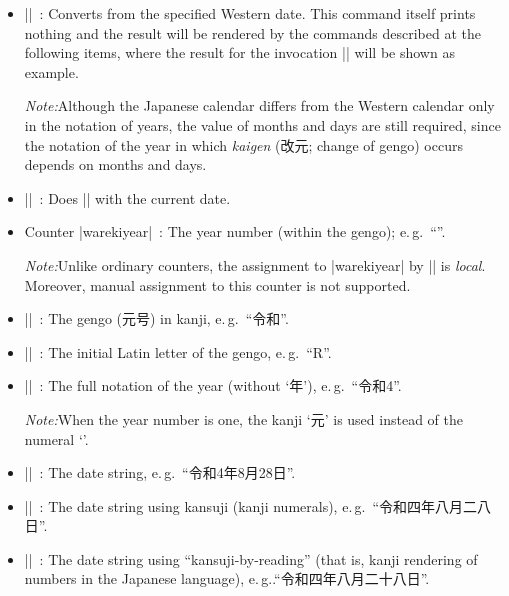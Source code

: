 \documentclass[a4paper]{article}
\newcommand{\Meta}[1]{$\langle$\textit{#1}$\rangle$}
\newcommand{\Note}{\par\noindent\emph{Note:}\quad}
\newcommand{\Eg}{e.\,g.}
\newcommand{\Means}{~:\quad}
\newcommand*{\Ja}[1]{{\fIpaex#1}}
\newcommand*{\+}{\hspace{0.25em minus 0.25em}}
\begin{document}
\begin{itemize}
\item |\warekisetdate{|\Meta{year}|}{|\Meta{month}|}{|\Meta{day}|}|\Means
  Converts from the specified Western date.
  This command itself prints nothing
  and the result will be rendered by the commands described
  at the following items, where the result for the invocation
  ||
  will be shown as example.

  \Note Although the Japanese calendar differs from the Western calendar
  only in the notation of years,
  the value of months and days are still required,
  since the notation of the year in which
  \emph{kaigen} (\Ja{改元}; change of gengo)
  occurs depends on months and days.

\item |\warekisettoday|\Means
  Does |\warekisetdate| with the current date.

\item Counter |warekiyear|\Means
  The year number (within the gengo); \Eg~``\Ja{4}''.

  \Note Unlike ordinary counters,
  the assignment to |warekiyear| by |\warekisetdate| is \emph{local}.
  Moreover, manual assignment to this counter is not supported.

\item |\warekigengo|\Means
  The gengo (\Ja{元号}) in kanji, \Eg~``\Ja{令和}''.

\item |\warekigengoinitial|\Means
  The initial Latin letter of the gengo, \Eg~``\Ja{R}''.

\item |\warekiyear|\Means
  The full notation of the year (without `\Ja{年}'),
  \Eg~``\Ja{令和\+4}''.

  \Note When the year number is one,
  the kanji `\Ja{元}' is used instead of the numeral `\Ja{1}'.

\item |\warekidate|\Means
  The date string, \Eg~``\Ja{令和\+4\+年\+8\+月\+28\+日}''.

\item |\warekikanjidate|\Means
  The date string using kansuji (kanji numerals),
  \Eg~``\Ja{令和四年八月二八日}''.

\item |\warekijkanjidate|\Means
  The date string using ``kansuji-by-reading''
  (that is, kanji rendering of numbers in the Japanese language),
  \Eg.``\Ja{令和四年八月二十八日}''.


\end{itemize}
\end{document}
